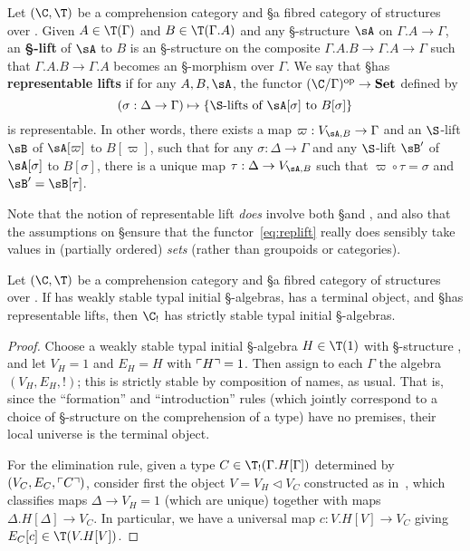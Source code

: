 \begin{enumerate}
\begin{defn}\label{defn:replift}
  Let $(\C,\T)$ be a comprehension category and \S a fibred category of structures over \C.
  Given $A\in\T(\Gamma)$ and $B\in\T(\Gamma.A)$ and any \S-structure $\sA$ on $\Gamma.A\to\Gamma$, an \textbf{\S-lift} of $\sA$ to $B$ is an \S-structure on the composite $\Gamma.A.B\to\Gamma.A\to\Gamma$ such that $\Gamma.A.B\to\Gamma.A$ becomes an \S-morphism over $\Gamma$.
  We say that \S has \textbf{representable lifts} if for any $A,B,\sA$, the functor $(\C/\Gamma)\op \to \mathbf{Set}$ defined by
  \begin{equation}\label{eq:replift}
    (\sigma:\Delta\to\Gamma) \mapsto \{ \text{\S-lifts of $\sA[\sigma]$ to $B[\sigma]$}\}
  \end{equation}
  is representable.
  In other words, there exists a map $\varpi:V_{\sA,B}\to\Gamma$ and an $\S$-lift $\sB$ of $\sA[\varpi]$ to $B[\varpi]$, such that for any $\sigma:\Delta\to\Gamma$ and any $\S$-lift $\sB'$ of $\sA[\sigma]$ to $B[\sigma]$, there is a unique map $\tau:\Delta\to V_{\sA,B}$ such that $\varpi \circ \tau = \sigma$ and $\sB' = \sB[\tau]$.
\end{defn}

Note that the notion of representable lift \emph{does} involve both \S and \T, and also that the assumptions on \S ensure that the functor~\eqref{eq:replift} really does sensibly take values in (partially ordered) \emph{sets} (rather than groupoids or categories).

\begin{lem}
  Let $(\C,\T)$ be a comprehension category and \S a fibred category of structures over \C.
  If \C has weakly stable typal initial \S-algebras, \C has a terminal object, and \S has representable lifts, then $\C_!$ has strictly stable typal initial \S-algebras.
\end{lem}
\begin{proof}
  Choose a weakly stable typal initial \S-algebra $H\in\T(1)$ with \S-structure \sH, and let $V_H = 1$ and $E_H = H$ with $\ulcorner H\urcorner= 1$.
  Then assign to each $\Gamma$ the algebra $(V_H,E_H,!)$; this is strictly stable by composition of names, as usual.
  That is, since the ``formation'' and ``introduction'' rules (which jointly correspond to a choice of \S-structure on the comprehension of a type) have no premises, their local universe is the terminal object.

  For the elimination rule, given a type $C\in \T_!(\Gamma.H[\Gamma])$ determined by $(V_C,E_C,\ulcorner C\urcorner)$, consider first the object $V = V_H\triangleleft V_C$ constructed as in~\cite{lw:localuniv}, which classifies maps $\Delta \to V_H = 1$ (which are unique) together with maps $\Delta.H[\Delta] \to V_C$.
  In particular, we have a universal map $c:V.H[V]\to V_C$ giving $E_C[c]\in \T(V.H[V])$.


\end{proof}
\end{enumerate}
